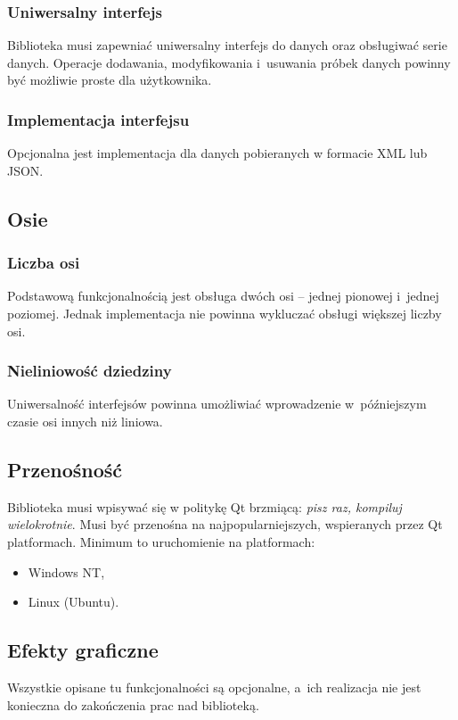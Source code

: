 \documentclass[11pt,twoside,a4paper,final]{article}
\begin{document}
\subsubsection{Uniwersalny interfejs}
Biblioteka musi zapewniać uniwersalny interfejs do danych oraz obsługiwać serie danych. Operacje dodawania, modyfikowania i~usuwania próbek danych powinny być możliwie proste dla użytkownika.

\subsubsection{Implementacja interfejsu} Opcjonalna jest implementacja dla danych pobieranych w formacie XML lub JSON.

\subsection{Osie}

\subsubsection{Liczba osi}
Podstawową funkcjonalnością jest obsługa dwóch osi -- jednej pionowej i~jednej poziomej. Jednak implementacja nie powinna wykluczać obsługi większej liczby osi. 

\subsubsection{Nieliniowość dziedziny}
Uniwersalność interfejsów powinna umożliwiać wprowadzenie w~późniejszym czasie osi innych niż liniowa.

\subsection{Przenośność}
Biblioteka musi wpisywać się w politykę Qt brzmiącą: \textit{pisz raz, kompiluj wielokrotnie}. Musi być przenośna na najpopularniejszych, wspieranych przez Qt platformach. Minimum to uruchomienie na platformach:

\begin{itemize}
\item{Windows NT,}
\item{Linux (Ubuntu).}
\end{itemize}


\subsection{Efekty graficzne}
Wszystkie opisane tu funkcjonalności są opcjonalne, a~ich realizacja nie jest konieczna do zakończenia prac nad biblioteką.
\end{document}
